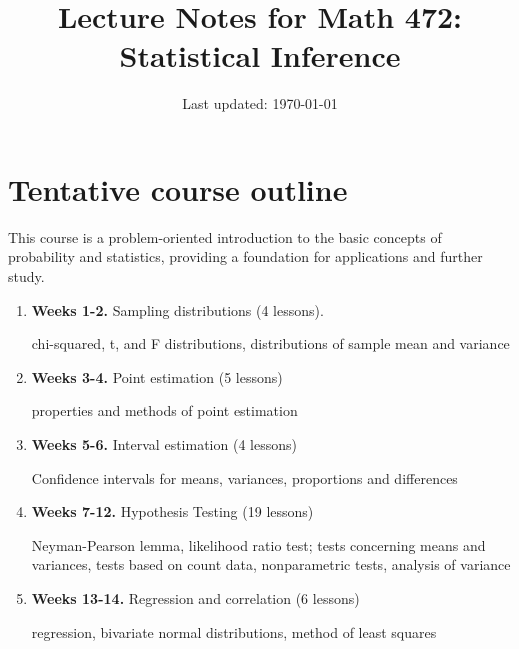 \documentclass[10pt]{article}
\title{Lecture Notes for Math 472: \\Statistical Inference}
\date{Last updated: \today}
\theoremstyle{definition}
\newcommand{\1}[1]{\textbf{1}_{\left[#1\right]}} %
\begin{document}
\maketitle




\tableofcontents
\newpage
\setcounter{section}{-1}
\section{Tentative course outline}

This course is a problem-oriented introduction to the basic concepts of probability and statistics,
providing a foundation for applications and further study.
\begin{enumerate}
  \item \textbf{Weeks 1-2.} Sampling distributions (4 lessons).

  chi-squared, t, and F distributions, distributions of sample mean and
  variance

  \item \textbf{Weeks 3-4.} Point estimation (5 lessons)

  properties and methods of point estimation

  \item \textbf{Weeks 5-6.} Interval estimation (4 lessons)

  Confidence intervals for means, variances, proportions and differences

  \item \textbf{Weeks 7-12.} Hypothesis Testing (19 lessons)

  Neyman-Pearson lemma, likelihood ratio test; tests concerning means and
  variances, tests based on count data, nonparametric tests, analysis of variance

  \item \textbf{Weeks 13-14.} Regression and correlation (6 lessons)

  regression, bivariate normal distributions, method of least squares
\end{enumerate}
\end{document}
